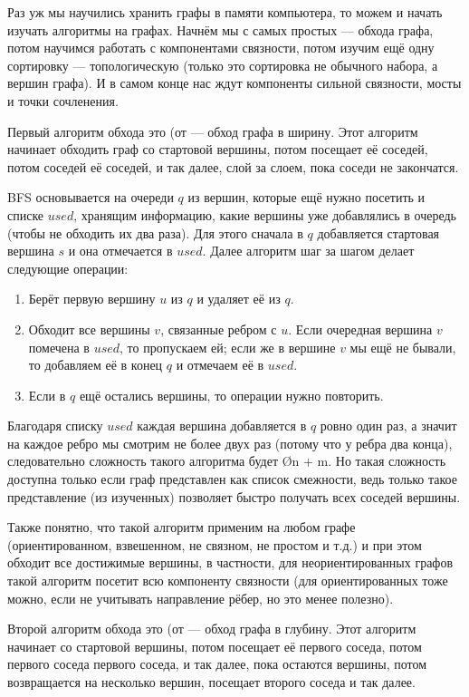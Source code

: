 Раз уж мы научились хранить графы в памяти компьютера, то можем и начать изучать алгоритмы на графах. Начнём мы с самых простых — обхода графа, потом научимся работать с компонентами связности, потом изучим ещё одну сортировку — топологическую (только это сортировка не обычного набора, а вершин графа). И в самом конце нас ждут компоненты сильной связности, мосты и точки сочленения.


Первый алгоритм обхода это  (от  — обход графа в ширину. Этот алгоритм начинает обходить граф со стартовой вершины, потом посещает её соседей, потом соседей её соседей, и так далее, слой за слоем, пока соседи не закончатся. 

BFS основывается на очереди $q$ из вершин, которые ещё нужно посетить и списке $used$, хранящим информацию, какие вершины уже добавлялись в очередь (чтобы не обходить их два раза). Для этого сначала в $q$ добавляется стартовая вершина $s$ и она отмечается в $used$. Далее алгоритм шаг за шагом делает следующие операции:

\begin{enumerate}
    \item Берёт первую вершину $u$ из $q$ и удаляет её из $q$.
    \item Обходит все вершины $v$, связанные ребром с $u$. Если очередная вершина $v$ помечена в $used$, то пропускаем ей; если же в вершине $v$ мы ещё не бывали, то добавляем её в конец $q$ и отмечаем её в $used$.
    \item Если в $q$ ещё остались вершины, то операции нужно повторить.
\end{enumerate}

Благодаря списку $used$ каждая вершина добавляется в $q$ ровно один раз, а значит на каждое ребро мы смотрим не более двух раз (потому что у ребра два конца), следовательно сложность такого алгоритма будет \O{n + m}. Но такая сложность доступна только если граф представлен как список смежности, ведь только такое представление (из изученных) позволяет быстро получать всех соседей вершины.

Также понятно, что такой алгоритм применим на любом графе (ориентированном, взвешенном, не связном, не простом и т.д.) и при этом обходит все достижимые вершины, в частности, для неориентированных графов такой алгоритм посетит всю компоненту связности (для ориентированных тоже можно, если не учитывать направление рёбер, но это менее полезно).


Второй алгоритм обхода это  (от  — обход графа в глубину. Этот алгоритм начинает со стартовой вершины, потом посещает её первого соседа, потом первого соседа первого соседа, и так далее, пока остаются вершины, потом возвращается на несколько вершин, посещает второго соседа и так далее.

